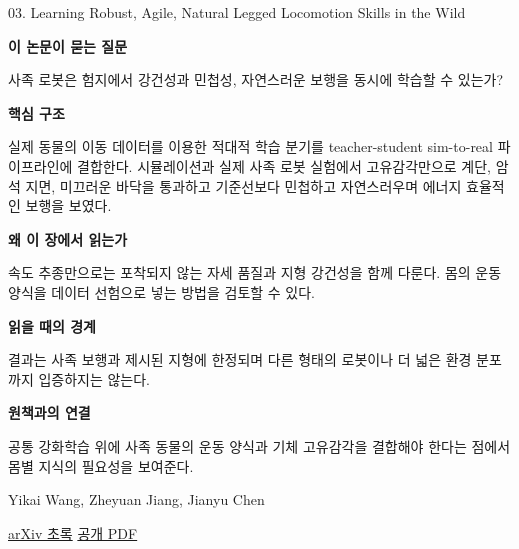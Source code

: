 \documentclass[11pt,openany]{book}
\begin{document}
\begin{termcard}{03. Learning Robust, Agile, Natural Legged Locomotion Skills in the Wild}

\par

\medskip

{\sffamily\bfseries\color{deepblue} 이 논문이 묻는 질문}\par

사족 로봇은 험지에서 강건성과 민첩성, 자연스러운 보행을 동시에 학습할 수 있는가?

\smallskip

{\sffamily\bfseries\color{deepblue} 핵심 구조}\par

실제 동물의 이동 데이터를 이용한 적대적 학습 분기를 teacher-student sim-to-real 파이프라인에 결합한다. 시뮬레이션과 실제 사족 로봇 실험에서 고유감각만으로 계단, 암석 지면, 미끄러운 바닥을 통과하고 기준선보다 민첩하고 자연스러우며 에너지 효율적인 보행을 보였다.

\smallskip

{\sffamily\bfseries\color{deepblue} 왜 이 장에서 읽는가}\par

속도 추종만으로는 포착되지 않는 자세 품질과 지형 강건성을 함께 다룬다. 몸의 운동 양식을 데이터 선험으로 넣는 방법을 검토할 수 있다.

\smallskip

{\sffamily\bfseries\color{coral} 읽을 때의 경계}\par

결과는 사족 보행과 제시된 지형에 한정되며 다른 형태의 로봇이나 더 넓은 환경 분포까지 입증하지는 않는다.

\smallskip

{\sffamily\bfseries\color{teal} 원책과의 연결}\par

공통 강화학습 위에 사족 동물의 운동 양식과 기체 고유감각을 결합해야 한다는 점에서 몸별 지식의 필요성을 보여준다.

\medskip

{\footnotesize\color{muted} Yikai Wang, Zheyuan Jiang, Jianyu Chen\par

\href{https://arxiv.org/abs/2304.10888}{arXiv 초록} \quad \href{https://arxiv.org/pdf/2304.10888}{공개 PDF}\par}

\end{termcard}
\end{document}

